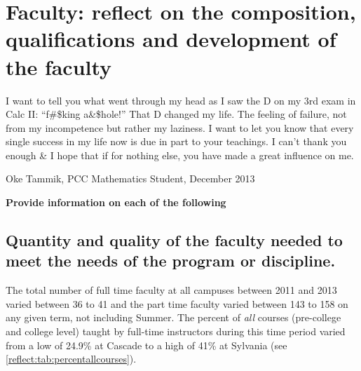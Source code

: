 \chapter[Faculty composition and qualifications]{Faculty:  reflect on the
composition, qualifications and development of the faculty}
\epigraph{ %
I want to tell you what went through my head as I saw the D on my 3rd exam in
Calc II:  ``f\#\$king a\&\$hole!''  That D changed my life.  The feeling of
failure, not from my incompetence but rather my laziness.
I want to let you know that every single success in my life now is due in part
to your teachings.  I can't thank you enough \& I hope that if for nothing
else, you have made a great influence on me.}{Oke Tammik, PCC Mathematics
Student, December 2013}


{\bfseries Provide information on each of the following}
\section[Quantity and quality of the faculty]{Quantity and quality of the faculty needed to meet the needs of the
program or discipline.}
The total number of full time faculty at all campuses between 2011 and 2013
varied between 36 to 41 and the 
part time faculty varied between 143 to 158 on any given term,  not including
Summer.     The percent of \emph{all} courses (pre-college and college level)
taught by full-time instructors during this time period varied from a low of
24.9\% at Cascade to a high of 41\% at Sylvania (see
\cref{reflect:tab:percentallcourses}).

